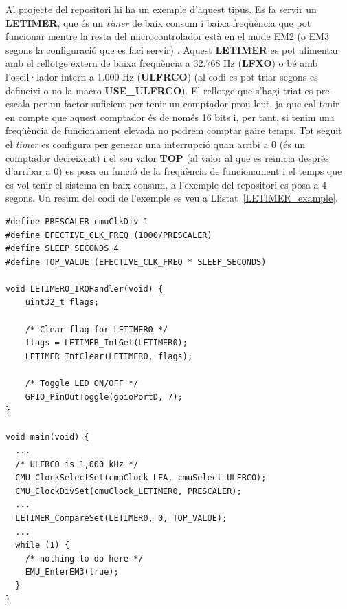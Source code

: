 Al \href{https://github.com/mariusmm/cursembedded/tree/master/Simplicity/LETIMER_LP}{projecte del repositori} hi ha un exemple d'aquest tipus. Es fa servir un {\bf LETIMER}, que és un {\em timer} de baix consum i baixa freqüència que pot funcionar mentre la resta del microcontrolador està en el mode EM2 (o EM3 segons la configuració que es faci servir) \cite[294]{EFM32TGRM}. Aquest {\bf LETIMER} es pot alimentar amb el rellotge extern de baixa freqüència a 32.768 Hz ({\bf LFXO}) o bé amb l'oscil·lador intern a 1.000 Hz ({\bf ULFRCO}) (al codi es pot triar segons es defineixi o no la macro {\bf USE\_ULFRCO}). El rellotge que s'hagi triat es pre-escala per un factor suficient per tenir un comptador prou lent, ja que cal tenir en compte que aquest comptador és de només 16 bits i, per tant, si tenim una freqüència de funcionament elevada no podrem comptar gaire temps.
Tot seguit el {\em timer} es configura per generar una interrupció quan arribi a 0 (és un comptador decreixent) i el seu valor {\bf TOP} (al valor al que es reinicia després d'arribar a 0) es posa en funció de la freqüència de funcionament i el temps que es vol tenir el sistema en baix consum, a l'exemple del repositori es posa a 4 segons. Un resum del codi de l'exemple es veu a Llistat~\ref{LETIMER_example}.

\begin{lstlisting}[style=customc, caption={Exemple ús de {\bf LETIMER}}, label=LETIMER_example]
#define PRESCALER cmuClkDiv_1
#define EFECTIVE_CLK_FREQ (1000/PRESCALER)
#define SLEEP_SECONDS 4
#define TOP_VALUE (EFECTIVE_CLK_FREQ * SLEEP_SECONDS)

void LETIMER0_IRQHandler(void) {
	uint32_t flags;

	/* Clear flag for LETIMER0 */
	flags = LETIMER_IntGet(LETIMER0);
	LETIMER_IntClear(LETIMER0, flags);

	/* Toggle LED ON/OFF */
	GPIO_PinOutToggle(gpioPortD, 7);
}

void main(void) {
  ...
  /* ULFRCO is 1,000 kHz */
  CMU_ClockSelectSet(cmuClock_LFA, cmuSelect_ULFRCO);
  CMU_ClockDivSet(cmuClock_LETIMER0, PRESCALER);
  ...
  LETIMER_CompareSet(LETIMER0, 0, TOP_VALUE);
  ...
  while (1) {
    /* nothing to do here */
    EMU_EnterEM3(true);
  }
}
\end{lstlisting}

